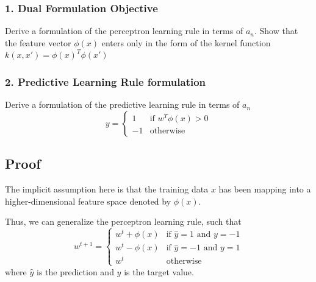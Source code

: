 \documentclass[parskip=full]{scrartcl}
\begin{document}
        \subsubsection*{1. Dual Formulation Objective} %
        \label{ssub:dual_formulation_objective}

            Derive a formulation of the perceptron learning rule in terms of $a_n$. Show that the feature vector $\phi(x)$ enters only in the form of the kernel function $k(x, x\prime) = \phi(x)^T\phi(x\prime)$
        

        \subsubsection*{2. Predictive Learning Rule formulation} %
        \label{ssub:predictive_learning_rule_formulation}
        
            Derive a formulation of the predictive learning rule in terms of $a_n$
            \begin{equation*}
                y = 
                \begin{cases}
                    1  & \text{if } w^T \phi(x) > 0 \\
                    -1 & \text{otherwise}
                \end{cases}
            \end{equation*}




    \subsection*{Proof} %
    \label{sub:proof_2}

        The implicit assumption here is that the training data $x$ has been mapping into a higher-dimensional feature space denoted by $\phi(x)$.

        Thus, we can generalize the perceptron learning rule, such that
        \begin{equation*}
            w^{t+1} = 
            \begin{cases}
                w^t + \phi(x) & \text{if } \hat{y} = 1 \text{ and } y = -1 \\
                w^t - \phi(x) & \text{if } \hat{y} = -1 \text{ and } y = 1 \\
                w^t & \text{otherwise}
            \end{cases}
        \end{equation*}
        where $\hat{y}$ is the prediction and $y$ is the target value.
\end{document}
